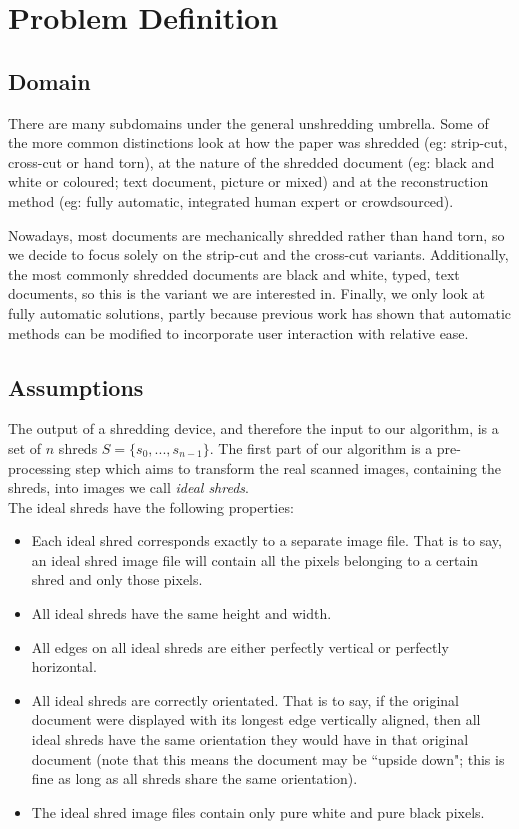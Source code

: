 \chapter{Problem Definition}
\label{chap2}
\section{Domain}
There are many subdomains under the general unshredding umbrella. Some of the more common distinctions look at how the paper was shredded (eg: strip-cut, cross-cut or hand torn), at the nature of the shredded document (eg: black and white or coloured; text document, picture or mixed) and at the reconstruction method (eg: fully automatic, integrated human expert or crowdsourced). 

Nowadays, most documents are mechanically shredded rather than hand torn, so we decide to focus solely on the strip-cut and the cross-cut variants. Additionally, the most commonly shredded documents are black and white, typed, text documents, so this is the variant we are interested in. Finally, we only look at fully automatic solutions, partly because previous work \cite{P1,P2,P5,P7} has shown that automatic methods can be modified to incorporate user interaction with relative ease.
 
\section{Assumptions}
\label{chap2Ass}
The output of a shredding device, and therefore the input to our algorithm, is a set of $n$ shreds $S = \{s_0, ..., s_{n-1}\}$. The first part of our algorithm is a pre-processing step which aims to transform the real scanned images, containing the shreds, into images we call \emph{ideal shreds}. \\
The ideal shreds have the following properties:
\begin{itemize}
\item Each ideal shred corresponds exactly to a separate image file. That is to say, an ideal shred image file will contain all the pixels belonging to a certain shred and only those pixels.
\item All ideal shreds have the same height and width.
\item All edges on all ideal shreds are either perfectly vertical or perfectly horizontal.
\item All ideal shreds are correctly orientated. That is to say, if the original document were displayed with its longest edge vertically aligned, then all ideal shreds have the same orientation they would have in that original document (note that this means the document may be ``upside down"; this is fine as long as all shreds share the same orientation).
\item The ideal shred image files contain only pure white and pure black pixels.
\end{itemize}

